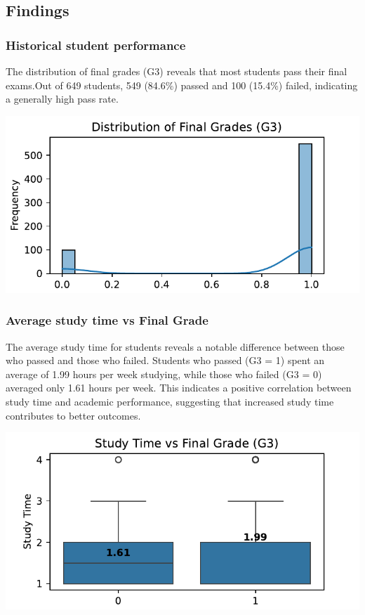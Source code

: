 \documentclass[preprint, 3p,
authoryear]{elsarticle} %
\begin{document}
\subsection{Findings}\label{findings-1}

\subsubsection{Historical student
performance}\label{historical-student-performance}

The distribution of final grades (G3) reveals that most students pass
their final exams.Out of 649 students, 549 (84.6\%) passed and 100
(15.4\%) failed, indicating a generally high pass rate.

\begin{center}\includegraphics[width=0.7\linewidth]{Final-Report_files/figure-latex/unnamed-chunk-10-7} \end{center}

\subsubsection{Average study time vs Final
Grade}\label{average-study-time-vs-final-grade}

The average study time for students reveals a notable difference between
those who passed and those who failed. Students who passed (G3 = 1)
spent an average of 1.99 hours per week studying, while those who failed
(G3 = 0) averaged only 1.61 hours per week. This indicates a positive
correlation between study time and academic performance, suggesting that
increased study time contributes to better outcomes.

\begin{center}\includegraphics[width=0.7\linewidth]{Final-Report_files/figure-latex/unnamed-chunk-11-9} \end{center}
\end{document}
